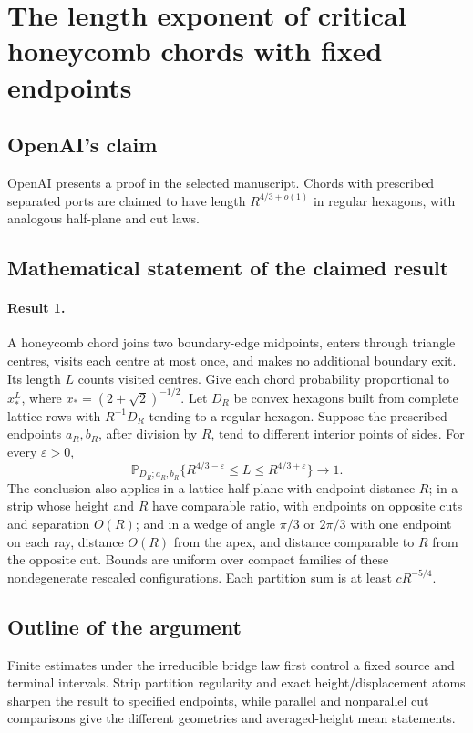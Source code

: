 \documentclass[11pt]{article}
\begin{document}
\section*{The length exponent of critical honeycomb chords with fixed endpoints}

\subsection{OpenAI's claim}
OpenAI presents a proof in the selected manuscript. Chords with prescribed separated ports are claimed to have length $R^{4/3+o(1)}$ in regular hexagons, with analogous half-plane and cut laws.

\subsection{Mathematical statement of the claimed result}
\paragraph{Result 1.} A honeycomb chord joins two boundary-edge midpoints, enters through triangle centres, visits each centre at most once, and makes no additional boundary exit. Its length $L$ counts visited centres. Give each chord probability proportional to $x_*^L$, where $x_*=(2+\sqrt2)^{-1/2}$. Let $D_R$ be convex hexagons built from complete lattice rows with $R^{-1}D_R$ tending to a regular hexagon. Suppose the prescribed endpoints $a_R,b_R$, after division by $R$, tend to different interior points of sides. For every $\varepsilon>0$,
\[
 \mathbb P_{D_R;a_R,b_R}\{R^{4/3-\varepsilon}\le L\le R^{4/3+\varepsilon}\}\longrightarrow1.
\]
The conclusion also applies in a lattice half-plane with endpoint distance $R$; in a strip whose height and $R$ have comparable ratio, with endpoints on opposite cuts and separation $O(R)$; and in a wedge of angle $\pi/3$ or $2\pi/3$ with one endpoint on each ray, distance $O(R)$ from the apex, and distance comparable to $R$ from the opposite cut. Bounds are uniform over compact families of these nondegenerate rescaled configurations. Each partition sum is at least $cR^{-5/4}$.

\subsection{Outline of the argument}
Finite estimates under the irreducible bridge law first control a fixed source and terminal intervals. Strip partition regularity and exact height/displacement atoms sharpen the result to specified endpoints, while parallel and nonparallel cut comparisons give the different geometries and averaged-height mean statements.
\end{document}
